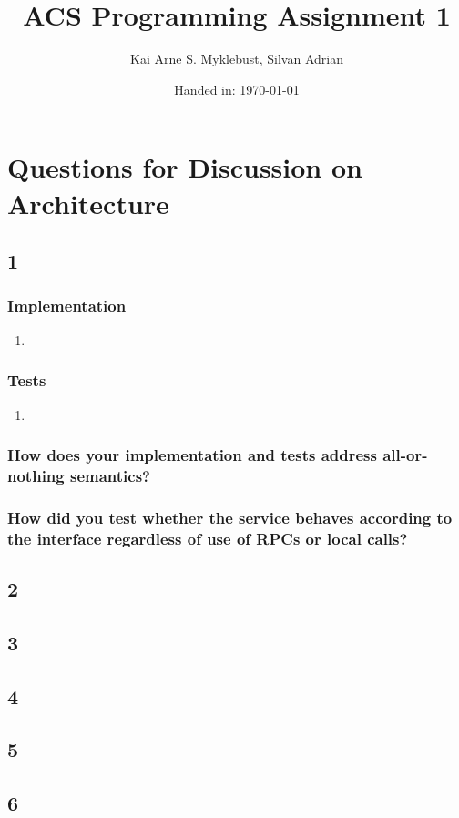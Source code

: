 \documentclass[12pt,a4paper]{article}
\begin{document}
\title{ACS Programming Assignment 1}
\subtitle{}

\author{Kai Arne S. Myklebust, Silvan Adrian}
\date{Handed in: \today}
	
\maketitle
\tableofcontents

\section{Questions for Discussion on Architecture}


\subsection{1}

\subsubsection{Implementation}
\begin{enumerate}[label=(\alph*)]
	\item 
\end{enumerate}

\subsubsection{Tests}
\begin{enumerate}[label=(\alph*)]
	\item 
\end{enumerate}

\subsubsection{How does your implementation and tests address all-or-nothing semantics?}

\subsubsection{How did you test whether the service behaves according to the interface regardless of use of RPCs or local calls?}

\subsection{2}

\subsection{3}

\subsection{4}

\subsection{5}

\subsection{6}
\end{document}
